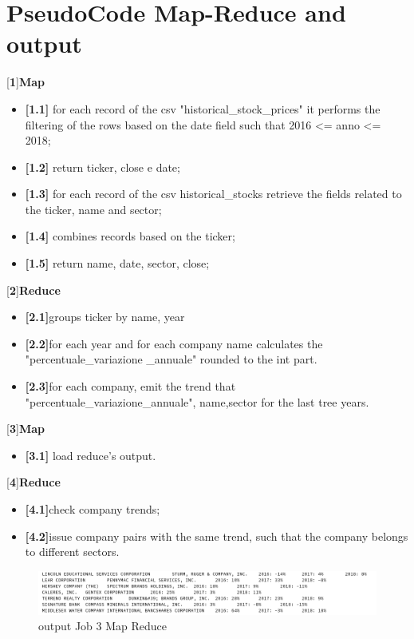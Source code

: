 \documentclass[]{report}
\begin{document}
\section*{PseudoCode Map-Reduce and output}
[\textbf{1}]\textbf{Map}\begin{itemize}
	\item \textbf{[1.1]}  for each record of the csv "historical\_stock\_prices" it performs the filtering of the rows based on the date field such that 2016 <= anno <= 2018;
	\item \textbf{[1.2]} return ticker, close e date;
	\item \textbf{[1.3]} for each record of the csv historical\_stocks retrieve the fields related to the ticker, name and sector;
	\item \textbf{[1.4]} combines records based on the ticker;
	\item \textbf{[1.5]} return name, date, sector, close;
\end{itemize}
[\textbf{2}]\textbf{Reduce} \begin{itemize}
	\item \textbf{[2.1]}groups ticker by name, year
	\item \textbf{[2.2]}for each year and for each company name calculates the  "percentuale\_variazione \_annuale" rounded to the int part.
	\item \textbf{[2.3]}for each company, emit the trend that "percentuale\_variazione\_annuale", name,sector for the last tree years.
\end{itemize}
[\textbf{3}]\textbf{Map}\begin{itemize}
	\item \textbf{[3.1]} load reduce's output.
\end{itemize}
[\textbf{4}]\textbf{Reduce} \begin{itemize}
	\item \textbf{[4.1]}check company trends;
	\item \textbf{[4.2]}issue company pairs with the same trend, such that the company belongs to different sectors.
\end{itemize}

\begin{center}
	\begin{figure}[!htb]
		\vspace{1 cm}
		\hspace{-4.7 cm}
		\includegraphics[width=1.8 \linewidth]{figure/output3map}
		\caption{output Job 3 Map Reduce}
	\end{figure}
\end{center}
\end{document}
